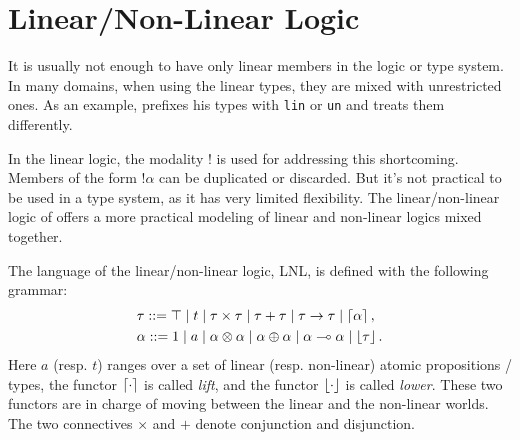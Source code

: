 \section{Linear/Non-Linear Logic}

It is usually not enough to have only linear members in the logic or type system. In many domains, when using the linear types, they are mixed with unrestricted ones. As an example, \cite{DavidWalker2004} prefixes his types with \texttt{lin} or \texttt{un} and treats them differently.

In the linear logic, the modality $!$ is used for addressing this shortcoming. Members of the form $!\alpha$ can be duplicated or discarded. But it's not practical to be used in a type system, as it has very limited flexibility.
%
The linear/non-linear logic of \cite{DBLP:conf/csl/Benton94} offers a more practical modeling of linear and non-linear logics mixed together.

The language of the linear/non-linear logic, LNL, is defined with the following grammar:
\begin{align*}
    &\tau ::= \top \mid t \mid \tau \times \tau \mid \tau + \tau \mid \tau \rightarrow \tau \mid \left\lceil \alpha \right\rceil, \\
    &\alpha ::= 1 \mid a \mid \alpha \otimes \alpha \mid \alpha \oplus \alpha \mid \alpha \multimap \alpha \mid \left\lfloor \tau \right\rfloor.
\end{align*}
Here $a$ (resp. $t$) ranges over a set of linear (resp. non-linear) atomic propositions / types, the functor $\left\lceil \cdot \right\rceil$ is called \textit{lift}, and the functor $\left\lfloor \cdot \right\rfloor$ is called \textit{lower}. These two functors are in charge of moving between the linear and the non-linear worlds. The two connectives $\times$ and $+$ denote conjunction and disjunction.
